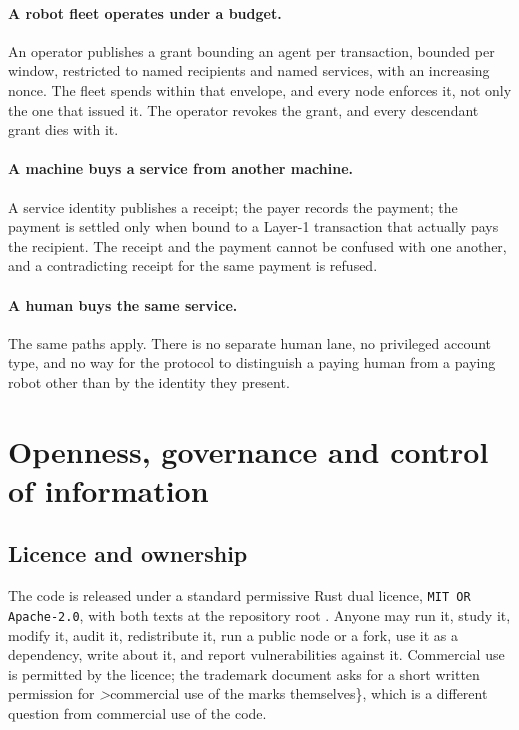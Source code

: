 \documentclass{article}
\begin{document}
\paragraph{A robot fleet operates under a budget.} An operator publishes a grant
bounding an agent per transaction, bounded per window, restricted to named
recipients and named services, with an increasing nonce. The fleet spends
within that envelope, and every node enforces it, not only the one that issued
it. The operator revokes the grant, and every descendant grant dies with it.

\paragraph{A machine buys a service from another machine.} A service identity
publishes a receipt; the payer records the payment; the payment is settled
only when bound to a Layer-1 transaction that actually pays the recipient. The
receipt and the payment cannot be confused with one another, and a
contradicting receipt for the same payment is refused.

\paragraph{A human buys the same service.} The same paths apply. There is no
separate human lane, no privileged account type, and no way for the protocol
to distinguish a paying human from a paying robot other than by the identity
they present.


\section{Openness, governance and control of information}
\label{sec:governance}

\subsection{Licence and ownership}

The code is released under a standard permissive Rust dual licence,
\texttt{MIT OR Apache-2.0}, with both texts at the repository root
\cite{srct-repo}. Anyone may run it, study it, modify it, audit it,
redistribute it, run a public node or a fork, use it as a dependency, write
about it, and report vulnerabilities against it. Commercial use is permitted by
the licence; the trademark document asks for a short written permission for
\emph>commercial use of the marks themselves\}, which is a different question
from commercial use of the code.
\end{document}

